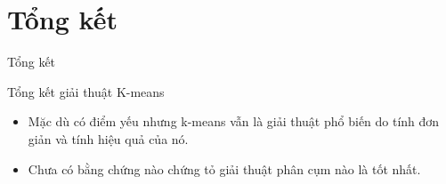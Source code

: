 \documentclass[english,10pt,table]{beamer}
\begin{document}
\section{Tổng kết}
\begin{frame}{Tổng kết}
\begin{block} {Tổng kết giải thuật K-means}
	\begin{itemize}
		\item Mặc dù có điểm yếu nhưng k-means vẫn là giải thuật phổ biến do tính đơn giản và tính hiệu quả của nó.
		\item Chưa có bằng chứng nào chứng tỏ giải thuật phân cụm nào là tốt nhất.
	\end{itemize}
\end{block}
\end{frame}
\end{document}
